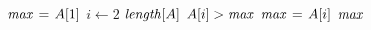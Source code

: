 \begin{codebox}
\li $\id{max} \gets A[1]$
\li \For $i \gets 2$ \To $\id{length}[A]$
\li \Do
      \If $A[i] > \id{max}$
\li   \Then
        $\id{max} \gets A[i]$
      \End    
    \End    
\li \Return $\id{max}$
\end{codebox}

